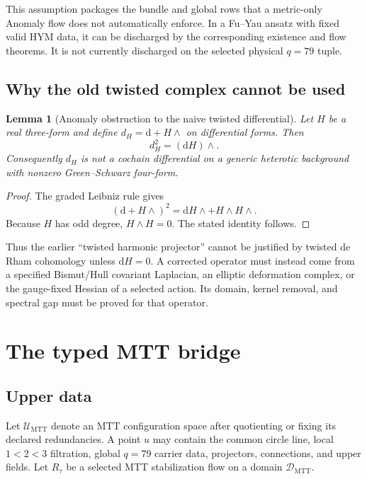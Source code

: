 \documentclass[11pt]{article}
\newtheorem{lemma}[theorem]{Lemma}
\theoremstyle{definition}
\theoremstyle{remark}
\newcommand{\dd}{\mathrm d}
\newcommand{\cD}{\mathcal D}
\newcommand{\cU}{\mathcal U}
\begin{document}
This assumption packages the bundle and global rows that a metric-only
Anomaly flow does not automatically enforce.  In a Fu--Yau ansatz with fixed
valid HYM data, it can be discharged by the corresponding existence and flow
theorems.  It is not currently discharged on the selected physical \(q=79\)
tuple.

\subsection{Why the old twisted complex cannot be used}

\begin{lemma}[Anomaly obstruction to the naive twisted differential]
\label{lem:twisted}
Let \(H\) be a real three-form and define
\(d_H=\dd+H\wedge\) on differential forms.  Then
\[
d_H^2=(\dd H)\wedge.
\]
Consequently \(d_H\) is not a cochain differential on a generic heterotic
background with nonzero Green--Schwarz four-form.
\end{lemma}

\begin{proof}
The graded Leibniz rule gives
\[
(\dd+H\wedge)^2
=\dd H\wedge+H\wedge H\wedge.
\]
Because \(H\) has odd degree, \(H\wedge H=0\).  The stated identity follows.
\end{proof}

Thus the earlier ``twisted harmonic projector'' cannot be justified by
twisted de Rham cohomology unless \(\dd H=0\).  A corrected operator must
instead come from a specified Bismut/Hull covariant Laplacian, an elliptic
deformation complex, or the gauge-fixed Hessian of a selected action.  Its
domain, kernel removal, and spectral gap must be proved for that operator.

\section{The typed MTT bridge}
\label{sec:bridge}

\subsection{Upper data}

Let \(\cU_{\mathrm{MTT}}\) denote an MTT configuration space after quotienting
or fixing its declared redundancies.  A point \(u\) may contain the common
circle line, local \(1<2<3\) filtration, global \(q=79\) carrier data,
projectors, connections, and upper fields.  Let \(R_\tau\) be a selected MTT
stabilization flow on a domain \(\cD_{\mathrm{MTT}}\).
\end{document}
